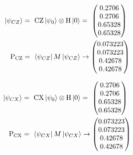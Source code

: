 \begin{equation}
    \centering
    \begin{split}
    \ket{\psi_{CZ}} &=\ \mathrm{CZ}\ket{\psi_0}\otimes\mathrm{H}\ket{0} =\ \begin{pmatrix}
     0.2706\\
     0.2706\\
     0.65328\\
     0.65328\\
     \end{pmatrix} \\
         \mathrm{P_{CZ}} &=\ \bra{\psi_{CZ}}M\ket{\psi_{CZ}} \rightarrow \begin{pmatrix}
         0.073223\\
         0.073223\\
         0.42678\\
         0.42678\\
     \end{pmatrix}
    \end{split}
    \label{equation:h_ry_cz_entanglement}
\end{equation}

\begin{equation}
    \centering
    \begin{split}
    \ket{\psi_{CX}} &=\ \mathrm{CX}\ket{\psi_0}\otimes\mathrm{H}\ket{0} =\ \begin{pmatrix}
     0.2706\\
     0.2706\\
     0.65328\\
     0.65328\\
     \end{pmatrix} \\
    \mathrm{P_{CX}} &=\ \bra{\psi_{CX}}M\ket{\psi_{CX}} \rightarrow \begin{pmatrix}
     0.073223\\
     0.073223\\
     0.42678\\
     0.42678\\
     \end{pmatrix}
    \end{split}
    \label{equation:h_ry_cx_entanglement}
\end{equation}

